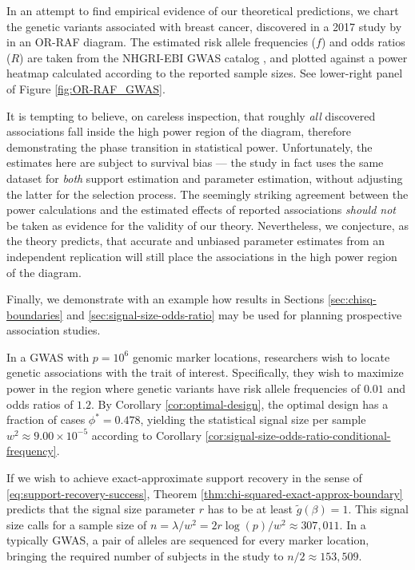 \begin{remark}
\label{rmk:OR-RAF_false_evidence}
In an attempt to find empirical evidence of our theoretical predictions, we chart the genetic variants associated with breast cancer, discovered in a 2017 study by \citet{michailidou2017association} in an OR-RAF diagram. 
The estimated risk allele frequencies ($f$) and odds ratios ($R$) are taken from the NHGRI-EBI GWAS catalog \cite{macarthur2016new}, and plotted against a power heatmap calculated according to the reported sample sizes. 
See lower-right panel of Figure \ref{fig:OR-RAF_GWAS}.

It is tempting to believe, on careless inspection, that roughly \emph{all} discovered associations fall inside the high power region of the diagram, therefore demonstrating the phase transition in statistical power.
Unfortunately, the estimates here are subject to survival {bias} --- the study in fact uses the {same} dataset for \emph{both} support estimation and parameter estimation, without adjusting the latter for the selection process.
The seemingly striking agreement between the power calculations and the estimated effects of reported associations \emph{should not} be taken as evidence for the validity of our theory.
Nevertheless, we conjecture, as the theory predicts, that accurate and unbiased parameter estimates from an independent replication will still place the associations in the high power region of the diagram. 
\end{remark}

Finally, we demonstrate with an example how results in Sections \ref{sec:chisq-boundaries} and \ref{sec:signal-size-odds-ratio} may be used for planning prospective association studies.

\begin{example}
In a GWAS with $p = 10^6$ genomic marker locations, researchers wish to locate genetic associations with the trait of interest.
Specifically, they wish to maximize power in the region where genetic variants have risk allele frequencies of $0.01$ and odds ratios of $1.2$.
By Corollary \ref{cor:optimal-design}, the optimal design has a fraction of cases $\phi^* = 0.478$, yielding the statistical signal size per sample $w^2\approx9.00\times10^{-5}$ according to Corollary \ref{cor:signal-size-odds-ratio-conditional-frequency}.

If we wish to achieve exact-approximate support recovery in the sense of \eqref{eq:support-recovery-success}, Theorem \ref{thm:chi-squared-exact-approx-boundary} predicts that the signal size parameter $r$ has to be at least $\widetilde{g}(\beta)= 1$.
This signal size calls for a sample size of $n = \lambda / w^2 = 2r\log(p)/w^2 \approx 307,011$.
In a typically GWAS, a pair of alleles are sequenced for every marker location, bringing the required number of subjects in the study to $n/2 \approx 153,509$.
\end{example}

